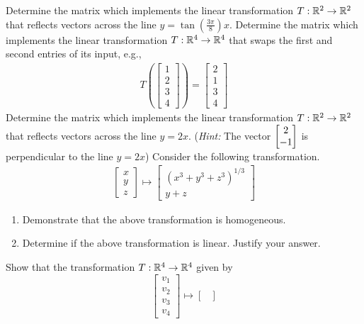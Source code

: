 \begin{tasks}[resume, style=enumerate]
\task
  Determine the matrix which implements the linear transformation $T :
  \mathbb R^2 \to \mathbb R^2$ that reflects vectors across the line $y =
  \tan(\frac{3\pi}{8})x$.
\task
  Determine the matrix which implements the linear transformation $T : \mathbb R^4
  \to \mathbb R^4$ that swaps the first and second entries of its input,
  e.g.,
  \begin{align*}
    T \left( \begin{bmatrix} 1 \\ 2 \\ 3 \\ 4 \end{bmatrix} \right)
    = \begin{bmatrix} 2 \\ 1 \\ 3 \\ 4 \end{bmatrix}
  \end{align*}
\task
  Determine the matrix which implements the linear transformation $T :
  \mathbb R^2 \to \mathbb R^2$ that reflects vectors across the line $y =
  2x$. (\textit{Hint:} The vector $ \begin{bmatrix} 2 \\ -1 \end{bmatrix} $ is perpendicular to
  the line $y = 2x$)
\task
  Consider the following transformation.
  \begin{align*}
    \begin{bmatrix}
      x \\ y \\ z
    \end{bmatrix}
    \mapsto
    \begin{bmatrix}
      (x^3 + y^3 + z^3)^{1 / 3} \\ y + z
    \end{bmatrix}
  \end{align*}
  \begin{enumerate}[label=(\alph*)]
  \item
    Demonstrate that the above transformation is homogeneous.
  \item
    Determine if the above transformation is linear.
    Justify your answer.
  \end{enumerate}
\task
  Show that the transformation $T: \mathbb R^4 \to \mathbb R^4$ given by
  \begin{displaymath}
    \begin{bmatrix}
      v_1 \\ v_2 \\ v_3 \\ v_4
    \end{bmatrix}
    \mapsto
    \begin{bmatrix}

\end{bmatrix}
\end{displaymath}
\end{tasks}
